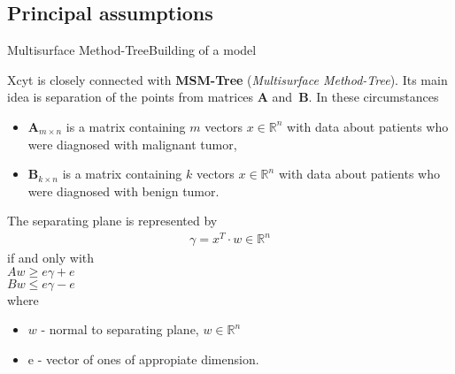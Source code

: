 \documentclass{beamer}
\begin{document}
\subsection{Principal assumptions}
\begin{frame}[allowframebreaks]{Multisurface Method-Tree}{Building of a model}

Xcyt is closely connected with \textbf{MSM-Tree} (\textit{Multisurface Method-Tree}). Its main idea is separation of the points from matrices \textbf{A} and~\textbf{B}. In these circumstances

\begin{itemize}
\item \textbf{A$_{m \times n}$} is a matrix containing $m$ vectors $x \in \mathbb{R}^n$ with data about patients who were diagnosed with malignant tumor,
\item \textbf{B$_{k \times n}$} is a matrix containing $k$ vectors $x \in \mathbb{R}^n$ with data about patients who were diagnosed with benign tumor.
\end{itemize}



The separating plane is represented by \cite{bcd}
\begin{align*}
\gamma=x^T \cdot w \in \mathbb{R}^n
\end{align*}
if and only with \\
$A w \geq e \gamma + e$ \\
$B w \leq e \gamma - e$\\
where 
\begin{itemize}
\item $w$ - normal to separating plane, $w \in \mathbb{R}^n$
\item e - vector of ones of appropiate dimension.
\end{itemize}





\end{frame}



\end{document}
